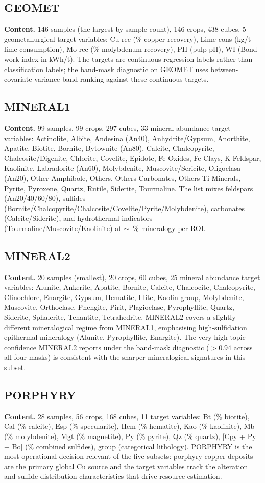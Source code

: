 \documentclass[11pt,a4paper]{article}
\begin{document}
\subsection{GEOMET}
\textbf{Content.} 146 samples (the largest by sample count), 146
crops, 438 cubes, 5 geometallurgical target variables: Cu rec
(\% copper recovery), Lime cons (kg/t lime consumption), Mo rec
(\% molybdenum recovery), PH (pulp pH), WI (Bond work index in
kWh/t). The targets are continuous regression labels rather than
classification labels; the band-mask diagnostic on GEOMET uses
between-covariate-variance band ranking against these continuous
targets.

\subsection{MINERAL1}
\textbf{Content.} 99 samples, 99 crops, 297 cubes, 33 mineral
abundance target variables: Actinolite, Albite, Andesina (An40),
Anhydrite/Gypsum, Anorthite, Apatite, Biotite, Bornite, Bytownite
(An80), Calcite, Chalcopyrite, Chalcosite/Digenite, Chlorite,
Covelite, Epidote, Fe Oxides, Fe-Clays, K-Feldspar, Kaolinite,
Labradorite (An60), Molybdenite, Muscovite/Sericite, Oligoclasa
(An20), Other Amphibole, Others, Others Carbonates, Others Ti
Minerals, Pyrite, Pyroxene, Quartz, Rutile, Siderite, Tourmaline.
The list mixes feldspars (An20/40/60/80), sulfides
(Bornite/Chalcopyrite/Chalcosite/Covelite/Pyrite/Molybdenite),
carbonates (Calcite/Siderite), and hydrothermal indicators
(Tourmaline/Muscovite/Kaolinite) at $\sim$~\% mineralogy per ROI.

\subsection{MINERAL2}
\textbf{Content.} 20 samples (smallest), 20 crops, 60 cubes, 25
mineral abundance target variables: Alunite, Ankerite, Apatite,
Bornite, Calcite, Chalcocite, Chalcopyrite, Clinochlore, Enargite,
Gypsum, Hematite, Illite, Kaolin group, Molybdenite, Muscovite,
Orthoclase, Phengite, Pirit, Plagioclase, Pyrophyllite, Quartz,
Siderite, Sphalerite, Tenantite, Tetrahedrite. MINERAL2 covers a
slightly different mineralogical regime from MINERAL1, emphasising
high-sulfidation epithermal mineralogy (Alunite, Pyrophyllite,
Enargite). The very high topic-confidence MINERAL2 reports under the
band-mask diagnostic ($> 0.94$ across all four masks) is consistent
with the sharper mineralogical signatures in this subset.

\subsection{PORPHYRY}
\textbf{Content.} 28 samples, 56 crops, 168 cubes, 11 target
variables: Bt (\% biotite), Cal (\% calcite), Esp (\% specularite),
Hem (\% hematite), Kao (\% kaolinite), Mb (\% molybdenite), Mgt
(\% magnetite), Py (\% pyrite), Qz (\% quartz), [Cpy + Py + Bo]
(\% combined sulfides), group (categorical lithology). PORPHYRY is
the most operational-decision-relevant of the five subsets:
porphyry-copper deposits are the primary global Cu source and the
target variables track the alteration and sulfide-distribution
characteristics that drive resource estimation.
\end{document}
